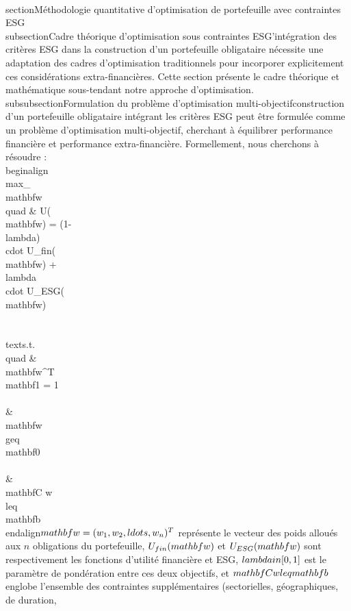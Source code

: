 \\section{Méthodologie quantitative d'optimisation de portefeuille avec contraintes ESG}\n\n\\subsection{Cadre théorique d'optimisation sous contraintes ESG}\n\nL'intégration des critères ESG dans la construction d'un portefeuille obligataire nécessite une adaptation des cadres d'optimisation traditionnels pour incorporer explicitement ces considérations extra-financières. Cette section présente le cadre théorique et mathématique sous-tendant notre approche d'optimisation.\n\n\\subsubsection{Formulation du problème d'optimisation multi-objectif}\n\nLa construction d'un portefeuille obligataire intégrant les critères ESG peut être formulée comme un problème d'optimisation multi-objectif, cherchant à équilibrer performance financière et performance extra-financière. Formellement, nous cherchons à résoudre :\n\n\\begin{align}\n\\max_{\\mathbf{w}} \\quad & U(\\mathbf{w}) = (1-\\lambda) \\cdot U_{fin}(\\mathbf{w}) + \\lambda \\cdot U_{ESG}(\\mathbf{w}) \\\\\n\\text{s.t.} \\quad & \\mathbf{w}^T \\mathbf{1} = 1 \\\\\n& \\mathbf{w} \\geq \\mathbf{0} \\\\\n& \\mathbf{C w} \\leq \\mathbf{b}\n\\end{align}\n{} $\\mathbf{w} = (w_1, w_2, \\ldots, w_n)^T$ représente le vecteur des poids alloués aux $n$ obligations du portefeuille, $U_{fin}(\\mathbf{w})$ et $U_{ESG}(\\mathbf{w})$ sont respectivement les fonctions d'utilité financière et ESG, $\\lambda \\in [0,1]$ est le paramètre de pondération entre ces deux objectifs, et $\\mathbf{C w} \\leq \\mathbf{b}$ englobe l'ensemble des contraintes supplémentaires (sectorielles, géographiques, de duration, 